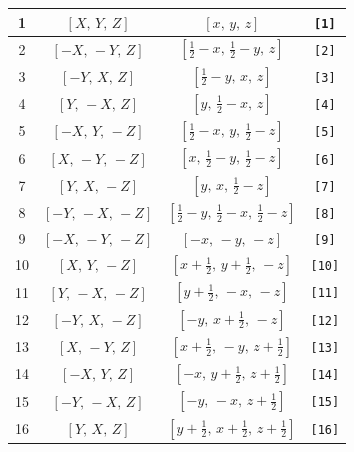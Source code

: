 \documentclass[fleqn,8pt]{jsarticle}
\begin{document}
\begin{longtable}{cccc}
1 & $\left[ X,\, Y,\, Z \right]$ & $\left[ x,\, y,\, z \right]$ & {\tt [1]} \\ \hline
2 & $\left[ - X,\, - Y,\, Z \right]$ & $\left[ \frac{1}{2} - x,\, \frac{1}{2} - y,\, z \right]$ & {\tt [2]} \\ \hline
3 & $\left[ - Y,\, X,\, Z \right]$ & $\left[ \frac{1}{2} - y,\, x,\, z \right]$ & {\tt [3]} \\ \hline
4 & $\left[ Y,\, - X,\, Z \right]$ & $\left[ y,\, \frac{1}{2} - x,\, z \right]$ & {\tt [4]} \\ \hline
5 & $\left[ - X,\, Y,\, - Z \right]$ & $\left[ \frac{1}{2} - x,\, y,\, \frac{1}{2} - z \right]$ & {\tt [5]} \\ \hline
6 & $\left[ X,\, - Y,\, - Z \right]$ & $\left[ x,\, \frac{1}{2} - y,\, \frac{1}{2} - z \right]$ & {\tt [6]} \\ \hline
7 & $\left[ Y,\, X,\, - Z \right]$ & $\left[ y,\, x,\, \frac{1}{2} - z \right]$ & {\tt [7]} \\ \hline
8 & $\left[ - Y,\, - X,\, - Z \right]$ & $\left[ \frac{1}{2} - y,\, \frac{1}{2} - x,\, \frac{1}{2} - z \right]$ & {\tt [8]} \\ \hline
9 & $\left[ - X,\, - Y,\, - Z \right]$ & $\left[ - x,\, - y,\, - z \right]$ & {\tt [9]} \\ \hline
10 & $\left[ X,\, Y,\, - Z \right]$ & $\left[ x + \frac{1}{2},\, y + \frac{1}{2},\, - z \right]$ & {\tt [10]} \\ \hline
11 & $\left[ Y,\, - X,\, - Z \right]$ & $\left[ y + \frac{1}{2},\, - x,\, - z \right]$ & {\tt [11]} \\ \hline
12 & $\left[ - Y,\, X,\, - Z \right]$ & $\left[ - y,\, x + \frac{1}{2},\, - z \right]$ & {\tt [12]} \\ \hline
13 & $\left[ X,\, - Y,\, Z \right]$ & $\left[ x + \frac{1}{2},\, - y,\, z + \frac{1}{2} \right]$ & {\tt [13]} \\ \hline
14 & $\left[ - X,\, Y,\, Z \right]$ & $\left[ - x,\, y + \frac{1}{2},\, z + \frac{1}{2} \right]$ & {\tt [14]} \\ \hline
15 & $\left[ - Y,\, - X,\, Z \right]$ & $\left[ - y,\, - x,\, z + \frac{1}{2} \right]$ & {\tt [15]} \\ \hline
16 & $\left[ Y,\, X,\, Z \right]$ & $\left[ y + \frac{1}{2},\, x + \frac{1}{2},\, z + \frac{1}{2} \right]$ & {\tt [16]} \\
\end{longtable}
\end{document}
